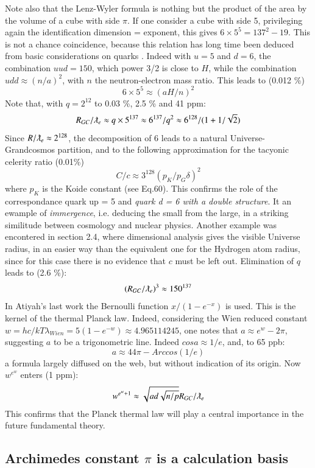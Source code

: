 \documentclass[twoside,draft]{article}
\begin{document}
\begin{sloppypar}
Note also that the Lenz-Wyler formula is nothing but the product of the area by the volume of a cube with side $\pi $. If one consider a cube with side 5, privileging again the identification dimension = exponent, this gives $6 \times 5^5 = 137^2 - 19 $. This is not a chance coincidence, because this relation has long time been deduced from basic considerations on quarks \cite{Sanchez1}. Indeed with $u = 5 $ and $d = 6 $, the combination $uud = 150 $, which power 3/2 is close to $H$, while the combination $udd \approx (n/a)^2 $, with $n$ the neutron-electron mass ratio. This leads to (0.012 \%) $$6\times 5^5 \approx (aH/n)^2 $$  
Note that, with $q = 2^{12}$ to 0.03 \%, 2.5 \% and 41 ppm:
$$R_{GC}/\lambdabar_e \approx q\times 5^{137} \approx 6^{137}/q^2 \approx 6^{128}/(1+1/\sqrt2)$$
Since $R/\lambdabar_e \approx 2^{128}$, the decomposition of 6 leads to a natural Universe-Grandcosmos partition, and to the following approximation for the tacyonic celerity ratio (0.01\%) 
$$ C/c\approx3^{128} (p_K/p_G \delta)^2 $$ where $p_K$ is the Koide constant (see Eq.60). This confirms the role of the correspondance quark up = 5 and \textit{quark d = 6 with a double structure}. It an ewample of \textit{immergence}, i.e. deducing the small from the large, in a striking similitude between cosmology and nuclear physics. Another example was encontered in section 2.4, where dimensional analysis gives the visible Universe radius, in an easier way than the equivalent one for the Hydrogen atom radius, since for this case there is no evidence that $c$ must be left out.
Elimination of $q$ leads to (2.6 \%):
$$(R_{GC}/\lambdabar_e)^3 \approx 150^{137}$$
 In Atiyah's last work the Bernoulli function $x/(1-e^{-x})$ is used. This is the kernel of the thermal Planck law. Indeed, considering the Wien reduced constant $w = hc/kT\lambda_{Wien} = 5 (1-e^{-w}) \approx 4.965114245$, one notes that $a \approx e^w -2\pi$, suggesting $a$ to be a trigonometric line. Indeed $cosa \approx 1/e$, and, to 65 ppb:
\begin{equation}
a \approx 44\pi - Arccos(1/e)
\end{equation}
a formula largely diffused on the web, but without indication of its origin. Now $w^{e^w}$ enters (1 ppm):
$$w^{e^w+1} \approx \sqrt{ad\sqrt{n/p}}R_{GC}/\lambdabar_e $$
This confirms that the Planck thermal law will play a central importance in the future fundamental theory. 

\subsection {Archimedes constant $\pi$ is a calculation basis}


\end{sloppypar}
\end{document}
